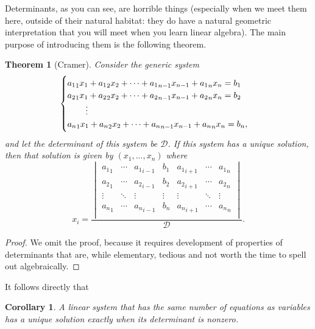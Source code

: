 \documentclass[a4paper,leqno]{article}
\numberwithin{equation}{section}
\newtheorem{thm}[equation]{Theorem}
\newtheorem{cor}[equation]{Corollary}
\theoremstyle{definition}
\theoremstyle{remark}
\begin{document}
Determinants, as you can see, are horrible things (especially when we meet them here, outside of their natural habitat: they do have a natural geometric
interpretation that you will meet when you learn linear algebra). The main purpose of introducing them is the following theorem.
\begin{thm}[Cramer]
  Consider the generic system
  \begin{equation*}
    \begin{cases}
      {a_1}_1 x_1 + {a_1}_2 x_2 + \cdots + {a_1}_{n - 1} x_{n - 1} + {a_1}_n x_n = b_1\\
      {a_2}_1 x_1 + {a_2}_2 x_2 + \cdots + {a_2}_{n - 1} x_{n - 1} + {a_2}_n x_n = b_2\\
        \hspace{0.15em}\qquad\vdots\\
      {a_n}_1 x_1 + {a_n}_2 x_2 + \cdots + {a_n}_{n - 1} x_{n - 1} + {a_n}_n x_n = b_n,
    \end{cases}
  \end{equation*}
  and let the determinant of this system be $ \mathcal{D} $.
  If this system has a unique solution, then that solution is given by $ (x_1, ..., x_n) $ where
  \begin{equation}
    x_i = \frac{
      \begin{vmatrix}
        {a_1}_1 & \cdots & {a_1}_{i - 1} & b_1 & {a_1}_{i + 1} & \cdots & {a_1}_n\\
        {a_2}_1 & \cdots & {a_2}_{i - 1} & b_2 & {a_2}_{i + 1} & \cdots & {a_2}_n\\
          \vdots & \ddots & \vdots & \vdots & \vdots & \ddots & \vdots \\
        {a_n}_1 & \cdots & {a_n}_{i - 1} & b_n & {a_n}_{i + 1} & \cdots & {a_n}_n\\
      \end{vmatrix}
    }{\mathcal{D}}.
  \end{equation}
\end{thm}
\begin{proof}
  We omit the proof, because it requires development of properties of determinants that are, while elementary, tedious
  and not worth the time to spell out algebraically.
\end{proof}

It follows directly that
\begin{cor}
  A linear system that has the same number of equations as variables has a unique solution exactly when its determinant is nonzero.
\end{cor}
\end{document}
